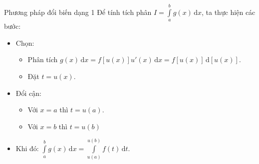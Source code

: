	\begin{dang}{Phương pháp đổi biến dạng 1 }
		Để tính tích phân $I=\displaystyle\int\limits_a^b g(x) \mathrm{\,d}x$, ta thực hiện các bước:
		\begin{itemize}
			\item [\textbf{Bước 1}] Chọn:
			\begin{itemize}
				\item Phân tích $g(x)\mathrm{\,d}x=f[u(x)]u'(x)\mathrm{\,d}x=f[u(x)]\mathrm{\,d}[u(x)]$.
				\item Đặt $t=u(x)$.
			\end{itemize}
			\item [\textbf{Bước 2}] Đổi cận:
			\begin{itemize}
				\item Với $x=a$ thì $t=u(a)$.
				\item Với $x=b$ thì $t=u(b)$
			\end{itemize}
			\item [\textbf{Bước 3}] Khi đó: $\displaystyle\int\limits_a^bg(x)\mathrm{\,d}x=\displaystyle\int\limits_{u(a)}^{u(b)}f(t)\mathrm{\,d}t$.
		\end{itemize}
	\end{dang}
	\setcounter{vd}{0}

